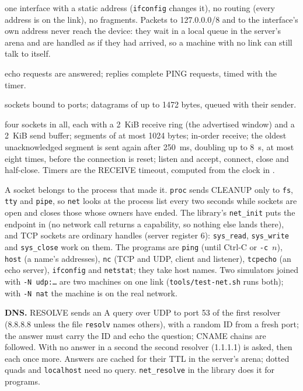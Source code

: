\begin{description}[leftmargin=1em,style=nextline]
\item[IPv4] one interface with a static address (\texttt{ifconfig} changes it), no routing (every
  address is on the link), no fragments. Packets to 127.0.0.0/8 and to the interface's own address
  never reach the device: they wait in a local queue in the server's arena and are handled as if they
  had arrived, so a machine with no link can still talk to itself.
\item[ICMP] echo requests are answered; replies complete PING requests, timed with the timer.
\item[UDP] sockets bound to ports; datagrams of up to 1472 bytes, queued with their sender.
\item[TCP] four sockets in all, each with a 2~KiB receive ring (the advertised window) and a 2~KiB
  send buffer; segments of at most 1024 bytes; in-order receive; the oldest unacknowledged segment is
  sent again after 250~ms, doubling up to 8~s, at most eight times, before the connection is reset;
  listen and accept, connect, close and half-close. Timers are the RECEIVE timeout, computed from the
  clock in .
\end{description}



A socket belongs to the process that made it. \texttt{proc} sends CLEANUP only to \texttt{fs},
\texttt{tty} and \texttt{pipe}, so \texttt{net} looks at the process list every two seconds while
sockets are open and closes those whose owners have ended. The library's \texttt{net\_init} puts the
endpoint in  (no network call returns a capability, so nothing else lands there), and TCP
sockets are ordinary handles (server register 6): \texttt{sys\_read}, \texttt{sys\_write} and
\texttt{sys\_close} work on them. The programs are \texttt{ping} (until Ctrl-C or \texttt{-c}~$n$),
\texttt{host} (a name's addresses), \texttt{nc} (TCP and UDP, client and listener), \texttt{tcpecho}
(an echo server), \texttt{ifconfig} and \texttt{netstat}; they take host names. Two simulators joined
with \texttt{-N udp:\ldots} are two machines on one link (\texttt{tools/test-net.sh} runs both); with
\texttt{-N nat} the machine is on the real network.

\textbf{DNS.} RESOLVE sends an A query over UDP to port 53 of the first resolver (8.8.8.8 unless the
file \texttt{resolv} names others), with a random ID from a fresh port; the answer must carry the ID
and echo the question; CNAME chains are followed. With no answer in a second the second resolver
(1.1.1.1) is asked, then each once more. Answers are cached for their TTL in the server's arena; dotted
quads and \texttt{localhost} need no query. \texttt{net\_resolve} in the library does it for programs.

